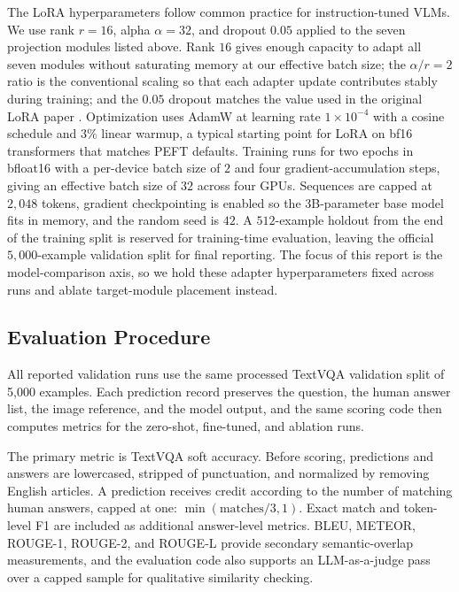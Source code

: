 \documentclass[11pt]{article}
\begin{document}
The LoRA hyperparameters follow common practice for instruction-tuned VLMs. We use rank $r{=}16$, alpha $\alpha{=}32$, and dropout $0.05$ applied to the seven projection modules listed above. Rank $16$ gives enough capacity to adapt all seven modules without saturating memory at our effective batch size; the $\alpha/r{=}2$ ratio is the conventional scaling so that each adapter update contributes stably during training; and the $0.05$ dropout matches the value used in the original LoRA paper \cite{hu2022lora}. Optimization uses AdamW at learning rate $1\times10^{-4}$ with a cosine schedule and $3\%$ linear warmup, a typical starting point for LoRA on bf16 transformers that matches PEFT defaults. Training runs for two epochs in bfloat16 with a per-device batch size of $2$ and four gradient-accumulation steps, giving an effective batch size of $32$ across four GPUs. Sequences are capped at $2{,}048$ tokens, gradient checkpointing is enabled so the 3B-parameter base model fits in memory, and the random seed is $42$. A $512$-example holdout from the end of the training split is reserved for training-time evaluation, leaving the official $5{,}000$-example validation split for final reporting. The focus of this report is the model-comparison axis, so we hold these adapter hyperparameters fixed across runs and ablate target-module placement instead.

\subsection{Evaluation Procedure}

All reported validation runs use the same processed TextVQA validation split of 5,000 examples. Each prediction record preserves the question, the human answer list, the image reference, and the model output, and the same scoring code then computes metrics for the zero-shot, fine-tuned, and ablation runs.

The primary metric is TextVQA soft accuracy. Before scoring, predictions and answers are lowercased, stripped of punctuation, and normalized by removing English articles. A prediction receives credit according to the number of matching human answers, capped at one: $\min(\mathrm{matches}/3, 1)$. Exact match and token-level F1 are included as additional answer-level metrics. BLEU, METEOR, ROUGE-1, ROUGE-2, and ROUGE-L provide secondary semantic-overlap measurements, and the evaluation code also supports an LLM-as-a-judge pass over a capped sample for qualitative similarity checking.
\end{document}
